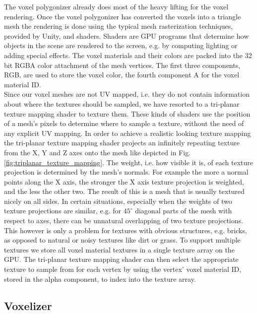 The voxel polygonizer already does most of the heavy lifting for the voxel rendering. Once the voxel polygonizer has converted the voxels into a triangle mesh the rendering is done using the typical mesh rasterization techniques, provided by Unity, and shaders. Shaders are GPU programs that determine how objects in the scene are rendered to the screen, e.g. by computing lighting or adding special effects. The voxel materials and their colors are packed into the 32 bit RGBA color attachment of the mesh vertices. The first three components, RGB, are used to store the voxel color, the fourth component A for the voxel material ID.\\
Since our voxel meshes are not UV mapped, i.e. they do not contain information about where the textures should be sampled, we have resorted to a tri-planar texture mapping shader to texture them. These kinds of shaders use the position of a mesh's pixels to determine where to sample a texture, without the need of any explicit UV mapping. In order to achieve a realistic looking texture
mapping the tri-planar texture mapping shader projects an infinitely repeating texture from the X, Y and Z axes onto the mesh
like depicted in Fig. \ref{fig:triplanar_texture_mapping}. The weight, i.e. how visible it is, of each texture projection is determined by the mesh's normals. For example the more a normal points along the X axis, the stronger the X axis texture projection is weighted, and the less the other two. The result of this is a mesh
that is usually textured nicely on all sides. In certain situations, especially when the weights of two texture projections are similar, e.g. for $45^{\circ}$ diagonal parts of the mesh with respect to axes, there can be unnatural overlapping of two texture projections. This however is only a problem for textures with obvious structures, e.g. bricks, as opposed to natural or noisy textures like dirt or grass. To support multiple textures we store all voxel material textures in a single texture array on the GPU. The tri-planar texture mapping shader can then select the appropriate texture to sample from for each vertex by using the vertex' voxel material ID, stored in the alpha component, to index into the texture array.

\subsection{Voxelizer}
\label{sec:voxelizer}


